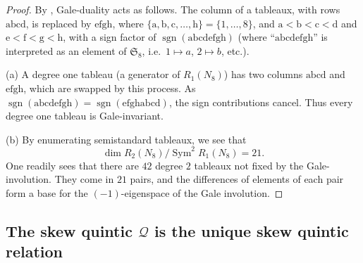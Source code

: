 \documentclass{amsart}
\newcommand{\cut}[1]{}
\theoremstyle{definition}
\theoremstyle{remark}
\DeclareMathOperator{\Sym}{Sym}
\DeclareMathOperator{\End}{End}
\DeclareMathOperator{\sgn}{sgn}
\def\SS{\mathfrak{S}}
\def\cubic{\mathcal{C}}
\def\quintic{\mathcal{Q}}
\let\mf\mathfrak
\begin{document}
\begin{proof}
By \cite[Thm.~1.12, p.~690]{hm}, 
Gale-duality acts as follows.   The column of a tableaux, with rows
$\text{abcd}$, is replaced by $\text{efgh}$, where $\{ \text{a}, \text{b}, \text{c}, \dots, \text{h} \} = \{ 1,
\dots, 8 \}$, and $\text{a}< \text{b} < \text{c} < \text{d}$ and
$\text{e}< \text{f} < \text{g} < \text{h}$, with a sign factor of
$\sgn( \text{abcdefgh})$ (where ``$\text{abcdefgh}$'' is interpreted as
an element of $\SS_8$, i.e.\ $1 \mapsto a$, $2 \mapsto b$, etc.).  

(a)   A degree one tableau (a generator of $R_1(N_8)$) has two columns
$\text{abcd}$ and $\text{efgh}$, which are swapped by this process.  As
$\sgn(\text{abcdefgh}) = \sgn(\text{efghabcd})$, the sign contributions cancel.
Thus every degree one tableau is Gale-invariant.

(b)  
By
enumerating
semistandard tableaux, we see that $$\dim 
R_2(N_8) /
\Sym^2 R_1(N_8) = 21.$$  One readily sees that there are $42$ degree
$2$ tableaux  not fixed by the Gale-involution.  They come in
$21$ pairs, and the differences of elements of each pair form a base
for the $(-1)$-eigenspace of the Gale involution.
\end{proof}


\cut{Ravi says:  I'd asked (Feb. 12 2010):  if we knew a little more, e.g. no linear
syzygies among the quartics, would that be enough to know the entire
free resolution of $N'_8$?  No one had any ideas.
Ben knows no degree $2$ relations, see August 11, 2008 and Oct. 23,
2008.  
Also no degree $3$ relations, 10/23/08.  I think I can do both via Bezout.  He knows the relations are
in degree at most $12$, 11/3/08.  I'm not sure if that includes the
degree $2$ generators.

Andrew says: 
I think I may be able to prove that the quartics have no linear syzygies, as follows.  Just as with
the linear syzygies of the derivatives of $\cubic$, the linear syzygies of the derivatives of $\quintic$ form
an $\SS_8$-stable Lie subalgebra of $\End(R_1(N_8))$.  As $\SS_8$ Lie algebras, $\End(R_1(N_8)) \cong \End(R_1(M_8))$,
and so our classification of $\SS_8$-subalgebras of the latter gives a classification of $\SS_8$-subalgebras of the
former.  As before, I'm guessing that $\mf{so}(R_1(N_8))$ cannot annihilate $\quintic$ since $\quintic$ has odd
degree.  Thus the annihilator of $\quintic$ is 0, i.e., there are no linear syzygies of its derivatives.}

\subsection{The skew quintic $\quintic$ is the unique skew quintic
  relation} 
\end{document}

